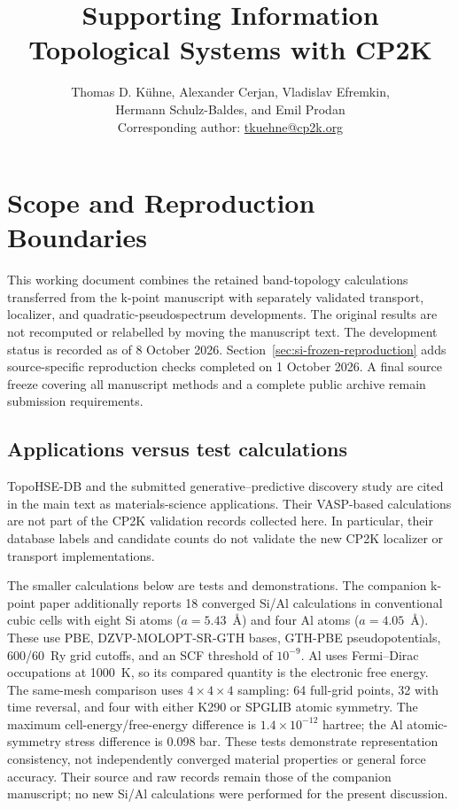 \documentclass[11pt]{article}
\title{Supporting Information\\Topological Systems with CP2K}
\author{Thomas D. K\"uhne, Alexander Cerjan, Vladislav Efremkin,\\
Hermann Schulz-Baldes, and Emil Prodan\\[0.4em]
\small Corresponding author: \href{mailto:tkuehne@cp2k.org}{tkuehne@cp2k.org}}
\date{}
\begin{document}
\maketitle
\section{Scope and Reproduction Boundaries}
This working document combines the retained band-topology calculations
transferred from the k-point manuscript with separately validated
transport, localizer, and quadratic-pseudospectrum developments.
The original results are not recomputed or relabelled by moving
the manuscript text.
The development status is recorded as of 8 October 2026.
Section~\ref{sec:si-frozen-reproduction} adds source-specific reproduction
checks completed on 1 October 2026. A final source freeze covering all
manuscript methods and a complete public archive remain submission
requirements.

\subsection*{Applications versus test calculations}
TopoHSE-DB and the submitted generative--predictive discovery study
are cited in the main text as materials-science applications.
Their VASP-based calculations are not part of the CP2K validation
records collected here. In particular, their database labels and
candidate counts do not validate the new CP2K localizer or transport
implementations.

The smaller calculations below are tests and demonstrations.
The companion k-point paper additionally reports 18 converged Si/Al
calculations in conventional cubic cells with eight Si atoms
($a=5.43$~\AA) and four Al atoms ($a=4.05$~\AA).
These use PBE, DZVP-MOLOPT-SR-GTH bases, GTH-PBE pseudopotentials,
600/60~Ry grid cutoffs, and an SCF threshold of $10^{-9}$.
Al uses Fermi--Dirac occupations at 1000~K, so its compared quantity
is the electronic free energy. The same-mesh comparison uses
$4\times4\times4$ sampling: 64 full-grid points, 32 with time reversal,
and four with either K290 or SPGLIB atomic symmetry.
The maximum cell-energy/free-energy difference is
$1.4\times10^{-12}$ hartree; the Al atomic-symmetry stress difference
is 0.098 bar. These tests demonstrate representation consistency,
not independently converged material properties or general force accuracy.
Their source and raw records remain those of the companion manuscript;
no new Si/Al calculations were performed for the present discussion.
\end{document}
